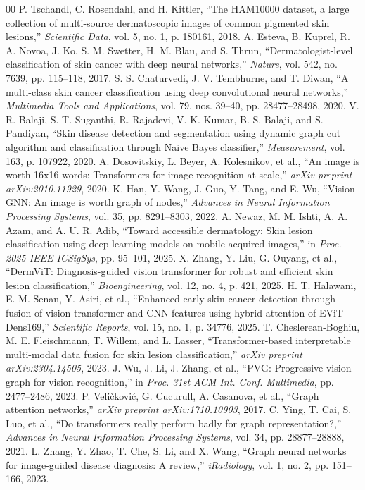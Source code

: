 \documentclass[conference]{IEEEtran}
\begin{document}
{\scriptsize
\begin{thebibliography}{00}
\setlength{\itemsep}{0pt}
 P. Tschandl, C. Rosendahl, and H. Kittler, ``The HAM10000 dataset, a large collection of multi-source dermatoscopic images of common pigmented skin lesions,'' \emph{Scientific Data}, vol. 5, no. 1, p. 180161, 2018.
 A. Esteva, B. Kuprel, R. A. Novoa, J. Ko, S. M. Swetter, H. M. Blau, and S. Thrun, ``Dermatologist-level classification of skin cancer with deep neural networks,'' \emph{Nature}, vol. 542, no. 7639, pp. 115--118, 2017.
 S. S. Chaturvedi, J. V. Tembhurne, and T. Diwan, ``A multi-class skin cancer classification using deep convolutional neural networks,'' \emph{Multimedia Tools and Applications}, vol. 79, nos. 39--40, pp. 28477--28498, 2020.
 V. R. Balaji, S. T. Suganthi, R. Rajadevi, V. K. Kumar, B. S. Balaji, and S. Pandiyan, ``Skin disease detection and segmentation using dynamic graph cut algorithm and classification through Naive Bayes classifier,'' \emph{Measurement}, vol. 163, p. 107922, 2020.
 A. Dosovitskiy, L. Beyer, A. Kolesnikov, et al., ``An image is worth 16x16 words: Transformers for image recognition at scale,'' \emph{arXiv preprint arXiv:2010.11929}, 2020.
 K. Han, Y. Wang, J. Guo, Y. Tang, and E. Wu, ``Vision GNN: An image is worth graph of nodes,'' \emph{Advances in Neural Information Processing Systems}, vol. 35, pp. 8291--8303, 2022.
 A. Newaz, M. M. Ishti, A. A. Azam, and A. U. R. Adib, ``Toward accessible dermatology: Skin lesion classification using deep learning models on mobile-acquired images,'' in \emph{Proc. 2025 IEEE ICSigSys}, pp. 95--101, 2025.
 X. Zhang, Y. Liu, G. Ouyang, et al., ``DermViT: Diagnosis-guided vision transformer for robust and efficient skin lesion classification,'' \emph{Bioengineering}, vol. 12, no. 4, p. 421, 2025.
 H. T. Halawani, E. M. Senan, Y. Asiri, et al., ``Enhanced early skin cancer detection through fusion of vision transformer and CNN features using hybrid attention of EViT-Dens169,'' \emph{Scientific Reports}, vol. 15, no. 1, p. 34776, 2025.
 T. Cheslerean-Boghiu, M. E. Fleischmann, T. Willem, and L. Lasser, ``Transformer-based interpretable multi-modal data fusion for skin lesion classification,'' \emph{arXiv preprint arXiv:2304.14505}, 2023.
 J. Wu, J. Li, J. Zhang, et al., ``PVG: Progressive vision graph for vision recognition,'' in \emph{Proc. 31st ACM Int. Conf. Multimedia}, pp. 2477--2486, 2023.
 P. Veli\v{c}kovi\'{c}, G. Cucurull, A. Casanova, et al., ``Graph attention networks,'' \emph{arXiv preprint arXiv:1710.10903}, 2017.
 C. Ying, T. Cai, S. Luo, et al., ``Do transformers really perform badly for graph representation?,'' \emph{Advances in Neural Information Processing Systems}, vol. 34, pp. 28877--28888, 2021.
 L. Zhang, Y. Zhao, T. Che, S. Li, and X. Wang, ``Graph neural networks for image-guided disease diagnosis: A review,'' \emph{iRadiology}, vol. 1, no. 2, pp. 151--166, 2023.
\end{thebibliography}
}
\end{document}
